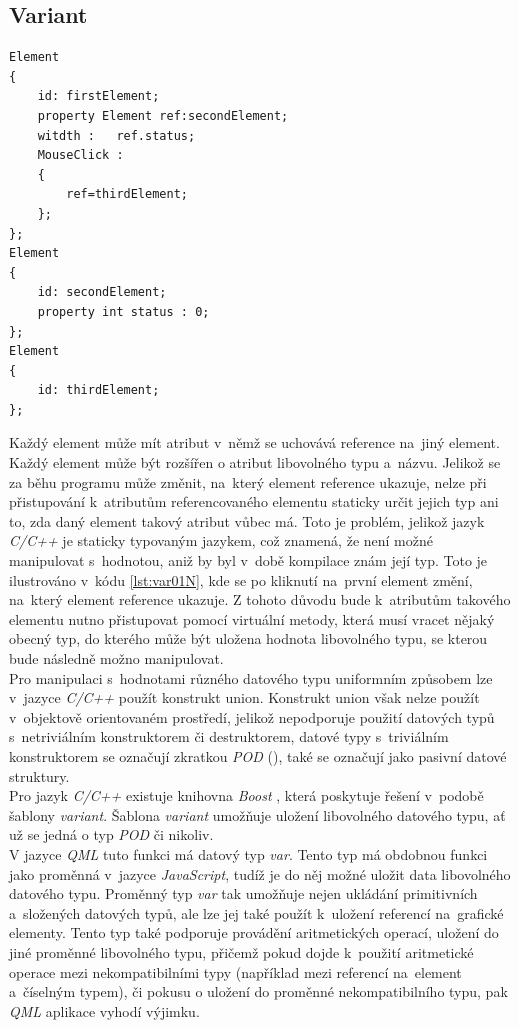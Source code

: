 \documentclass[11pt,twoside,a4paper]{book}
\begin{document}
\subsection {Variant}
\begin{lstlisting}[float,frame=single,caption=Ukázka \textit{CQML} kódu ilustrující nemožnost staticky určit existenci specifického atributu.,label=lst:var01N]
Element
{
	id: firstElement;
	property Element ref:secondElement;
	witdth :   ref.status;
	MouseClick :
	{
		ref=thirdElement;
	};
};
Element
{
	id: secondElement;
	property int status : 0;
};
Element
{
	id: thirdElement;
};
\end{lstlisting}
Každý element může mít atribut v~němž se uchovává reference na~jiný element. Každý element může být rozšířen o atribut libovolného typu a~názvu. Jelikož se za běhu programu může změnit, na~který element reference ukazuje, nelze při přistupování k~atributům referencovaného elementu staticky určit jejich typ ani to, zda daný element takový atribut vůbec má. Toto je problém, jelikož jazyk \textit{C/C++} je staticky typovaným jazykem, což znamená, že není možné manipulovat s~hodnotou, aniž by byl v~době kompilace znám její typ. Toto je ilustrováno v~kódu \ref{lst:var01N}, kde se po kliknutí na~první element změní, na~který element reference ukazuje. Z tohoto důvodu bude k~atributům takového elementu nutno přistupovat pomocí virtuální metody, která musí vracet nějaký obecný typ, do kterého může být uložena hodnota libovolného typu, se kterou bude následně možno manipulovat.\\
Pro manipulaci s~hodnotami různého datového typu uniformním způsobem lze v~jazyce \textit{C/C++} použít konstrukt union. Konstrukt union však nelze použít v~objektově orientovaném prostředí, jelikož nepodporuje použití datových typů s~netriviálním konstruktorem či destruktorem, datové typy s~triviálním konstruktorem se označují zkratkou \textit{POD} (), také se označují jako pasivní datové struktury.\\
Pro jazyk \textit{C/C++} existuje knihovna \textit{Boost} \cite{bib:boost}, která poskytuje řešení v~podobě šablony \textit{variant}. Šablona \textit{variant} umožňuje uložení libovolného datového typu, ať už se jedná o typ \textit{POD} či nikoliv.\\
V jazyce \textit{QML} tuto funkci má datový typ \textit{var}. Tento typ má obdobnou funkci jako proměnná v~jazyce \textit{JavaScript}, tudíž je do něj možné uložit data libovolného datového typu. Proměnný typ \textit{var} tak umožňuje nejen ukládání primitivních a~složených datových typů, ale lze jej také použít k~uložení referencí na~grafické elementy. Tento typ také podporuje provádění aritmetických operací, uložení do jiné proměnné libovolného typu, přičemž pokud dojde k~použití aritmetické operace mezi nekompatibilními typy (například mezi referencí na~element a~číselným typem), či pokusu o uložení do proměnné nekompatibilního typu, pak \textit{QML} aplikace vyhodí výjimku.\\
\end{document}
